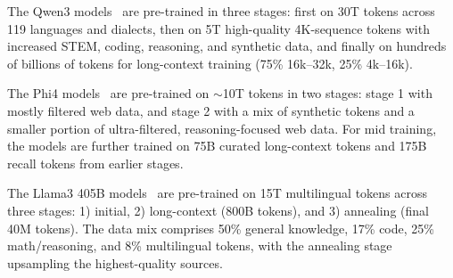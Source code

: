 The Qwen3 models~\cite{yang2025qwen3} are pre-trained in three stages: first on 30T tokens across 119 languages and dialects, then on 5T high-quality 4K-sequence tokens with increased STEM, coding, reasoning, and synthetic data, and finally on hundreds of billions of tokens for long-context training (75\% 16k–32k, 25\% 4k–16k).


The Phi4 models~\cite{abdin2024phi} are pre-trained on $\sim$10T tokens in two stages: stage 1 with mostly filtered web data, and stage 2 with a mix of synthetic tokens and a smaller portion of ultra-filtered, reasoning-focused web data. For mid training, the models are further trained on 75B curated long-context tokens and 175B recall tokens from earlier stages.

The Llama3 405B models~\cite{Dubey2024TheL3} are pre-trained on 15T multilingual tokens across three stages: 1) initial, 2) long-context (800B tokens), and 3) annealing (final 40M tokens). The data mix comprises 50\% general knowledge, 17\% code, 25\% math/reasoning, and 8\% multilingual tokens, with the annealing stage upsampling the highest-quality sources.

